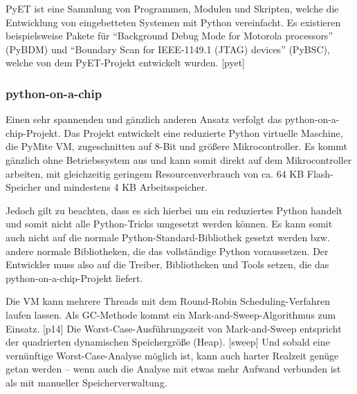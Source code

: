 PyET ist eine Sammlung von Programmen, Modulen und Skripten, welche die
Entwicklung von eingebetteten Systemen mit Python vereinfacht. Es existieren
beispielsweise Pakete für “Background Debug Mode for Motorola processors”
(PyBDM) und “Boundary Scan for IEEE-1149.1 (JTAG) devices” (PyBSC), welche
von dem PyET-Projekt entwickelt wurden. [pyet]


\subsubsection{python-on-a-chip}


Einen sehr spannenden und gänzlich anderen Ansatz verfolgt das
python-on-a-chip-Projekt. Das Projekt entwickelt eine reduzierte Python
virtuelle Maschine, die PyMite VM, zugeschnitten auf 8-Bit und größere
Mikrocontroller. Es kommt gänzlich ohne Betriebssystem aus und kann somit
direkt auf dem Mikrocontroller arbeiten, mit gleichzeitig geringem
Resourcenverbrauch von ca. 64 KB Flash-Speicher und mindestens
4 KB Arbeitsspeicher.

Jedoch gilt zu beachten, dass es sich hierbei um ein reduziertes Python
handelt und somit nicht alle Python-Tricks umgesetzt werden können. Es kann
somit auch nicht auf die normale Python-Standard-Bibliothek gesetzt werden
bzw. andere normale Bibliotheken, die das vollständige Python voraussetzen.
Der Entwickler muss also auf die Treiber, Bibliotheken und Tools setzen, die
das python-on-a-chip-Projekt liefert.

Die VM kann mehrere Threads mit dem Round-Robin Scheduling-Verfahren laufen
lassen. Als GC-Methode kommt ein Mark-and-Sweep-Algorithmus zum Einsatz. [p14]
Die Worst-Case-Ausführungszeit von Mark-and-Sweep entspricht der quadrierten
dynamischen Speichergröße (Heap). [sweep] Und sobald eine vernünftige
Worst-Case-Analyse möglich ist, kann auch harter Realzeit genüge getan werden
-- wenn auch die Analyse mit etwas mehr Aufwand verbunden ist als mit
manueller Speicherverwaltung.
